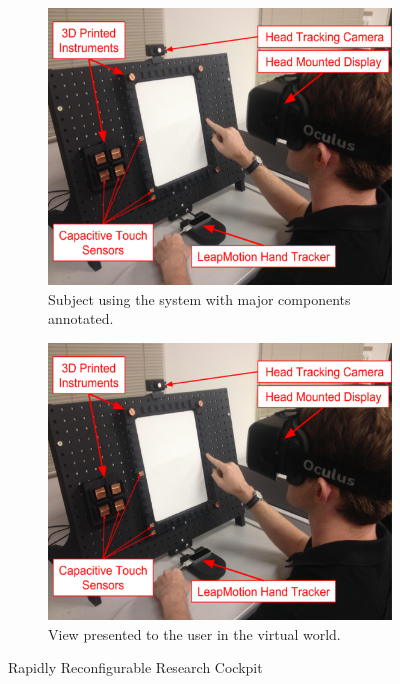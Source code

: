 \documentclass[]{aiaa-tc}%
\begin{document}
\begin{figure}[tb]
  \centering
  \begin{subfigure}{.49\textwidth}
    \centering
    \includegraphics[width=.99\linewidth]{figures/r3c_callout.png}
    \caption{Subject using the system with major components annotated.}
    \label{fig:r3c_sub1}
  \end{subfigure}
  \begin{subfigure}{.49\textwidth}
    \centering
    \includegraphics[width=.99\linewidth]{figures/r3c_callout.png}
    \caption{View presented to the user in the virtual world.}
    \label{fig:r3c_sub2}
  \end{subfigure}
  \caption{Rapidly Reconfigurable Research Cockpit}
\end{figure}
\end{document}
